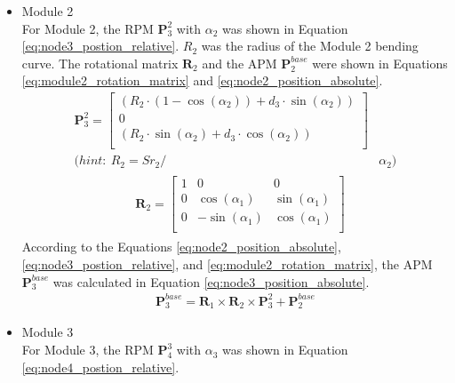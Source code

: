 \begin{itemize}
    \item Module 2 \\
    For Module 2, the RPM $\textbf{P}_{3}^{2}$ 
    with $\alpha_2$ was shown in Equation \ref{eq:node3_postion_relative}. $R_2$ was the radius of the Module 2 bending 
    curve. The rotational matrix $\textbf{R}_{2}$ and the APM $\textbf{P}_{2}^{base}$ were shown 
    in Equations \ref*{eq:module2_rotation_matrix} and \ref{eq:node2_position_absolute}.
    \begin{align}
        \textbf{P}_{3}^{2} = 
        \begin{bmatrix}
            (R_2\cdot(1-\cos(\alpha_2)) + d_3\cdot \sin(\alpha_2)) \\
            0 \\
            (R_2\cdot \sin(\alpha_2) + d_3\cdot \cos(\alpha_2)) \\
        \end{bmatrix}&
        \label{eq:node3_postion_relative} \\
        \nonumber (hint: \ R_2 = {Sr}_2/ &\alpha_2)
    \end{align}
    \vspace{-15mm}
    \begin{align}
        &\begin{aligned}
            \textbf{R}_{2} = 
            \begin{bmatrix}
                1 & 0 & 0 \\
                0 & \cos(\alpha_1) & \sin(\alpha_1) \\
                0 & -\sin(\alpha_1) & \cos(\alpha_1) \\
            \end{bmatrix}
        \end{aligned}
        \label{eq:module2_rotation_matrix}
    \end{align}
    According to the Equations \ref{eq:node2_position_absolute}, \ref{eq:node3_postion_relative}, and 
    \ref*{eq:module2_rotation_matrix}, the APM 
    $\textbf{P}_{3}^{base}$ was calculated in Equation \ref{eq:node3_position_absolute}.
    \begin{align}
        \textbf{P}_{3}^{base} = \textbf{R}_{1} \times \textbf{R}_{2} 
        \times \textbf{P}_{3}^{2} + \textbf{P}_{2}^{base}
        \label{eq:node3_position_absolute}
    \end{align}
    \item Module 3 \\
    For Module 3, the RPM $\textbf{P}_{4}^{3}$ with $\alpha_3$ was shown in Equation \ref{eq:node4_postion_relative}. 

\end{itemize}
